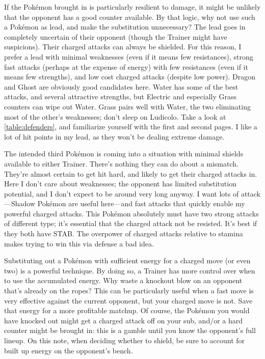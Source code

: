 If the Pokémon brought in is particularly resilient to damage, it might be unlikely that
 the opponent has a good counter available.
By that logic, why not use such a Pokémon as lead, and make the substitution unnecessary?
The lead goes in completely uncertain of their opponent (though the Trainer might have suspicions).
Their charged attacks can always be shielded.
For this reason, I prefer a lead with minimal weaknesses (even if it means few resistances),
 strong fast attacks (perhaps at the expense of energy) with few resistances (even if it means
 few strengths), and low cost charged attacks (despite low power). 
Dragon and Ghost are obviously good candidates here.
Water has some of the best attacks, and several attractive strengths, but Electric and
 especially Grass counters can wipe out Water.
Grass pairs well with Water, the two eliminating most of the other's weaknesses;
 don't sleep on Ludicolo.
Take a look at \autoref{table:defenders}, and familiarize yourself with the first
 and second pages.
I like a lot of hit points in my lead, as they won't be dealing extreme damage.

The intended third Pokémon is coming into a situation with minimal shields available
 to either Trainer.
There's nothing they can do about a mismatch.
They're almost certain to get hit hard, and likely to get their charged attacks in.
Here I don't care about weaknesses; the opponent has limited substitution potential,
 and I don't expect to be around very long anyway.
I want lots of attack---Shadow Pokémon are useful here---and fast attacks that quickly enable my powerful charged attacks.
This Pokémon absolutely must have two strong attacks of different type; it's essential that the charged attack not be resisted.
It's best if they both have STAB\@.
The overpower of charged attacks relative to stamina makes trying to win this via defense a bad idea.

Substituting out a Pokémon with sufficient energy for a charged move (or even two) is a powerful technique.
By doing so, a Trainer has more control over when to use the accumulated energy.
Why waste a knockout blow on an opponent that's already on the ropes?
This can be particularly useful when a fast move is very effective against the current opponent,
 but your charged move is not.
Save that energy for a more profitable matchup.
Of course, the Pokémon you would have knocked out might get a charged attack off on your sub,
 and/or a hard counter might be brought in:
 this is a gamble until you know the opponent's full lineup.
On this note, when deciding whether to shield, be sure to account for built up energy on the opponent's bench.

